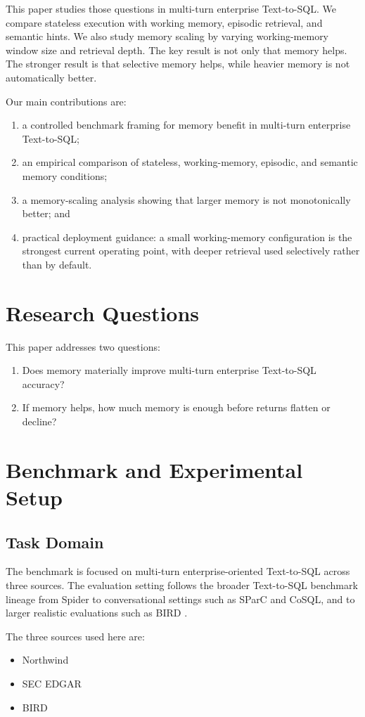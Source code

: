 \documentclass[11pt]{article}
\begin{document}
This paper studies those questions in multi-turn enterprise Text-to-SQL. We compare stateless execution with working memory, episodic retrieval, and semantic hints. We also study memory scaling by varying working-memory window size and retrieval depth. The key result is not only that memory helps. The stronger result is that selective memory helps, while heavier memory is not automatically better.

Our main contributions are:
\begin{enumerate}[leftmargin=1.5em]
  \item a controlled benchmark framing for memory benefit in multi-turn enterprise Text-to-SQL;
  \item an empirical comparison of stateless, working-memory, episodic, and semantic memory conditions;
  \item a memory-scaling analysis showing that larger memory is not monotonically better; and
  \item practical deployment guidance: a small working-memory configuration is the strongest current operating point, with deeper retrieval used selectively rather than by default.
\end{enumerate}

\section{Research Questions}
This paper addresses two questions:
\begin{enumerate}[leftmargin=1.5em]
  \item Does memory materially improve multi-turn enterprise Text-to-SQL accuracy?
  \item If memory helps, how much memory is enough before returns flatten or decline?
\end{enumerate}

\section{Benchmark and Experimental Setup}
\subsection{Task Domain}
The benchmark is focused on multi-turn enterprise-oriented Text-to-SQL across three sources. The evaluation setting follows the broader Text-to-SQL benchmark lineage from Spider to conversational settings such as SParC and CoSQL, and to larger realistic evaluations such as BIRD \cite{yu2018spider,yu2019sparc,yu2019cosql,li2023bird}.
\par
The three sources used here are:
\begin{itemize}[leftmargin=1.5em]
  \item Northwind
  \item SEC EDGAR
  \item BIRD
\end{itemize}
\end{document}
